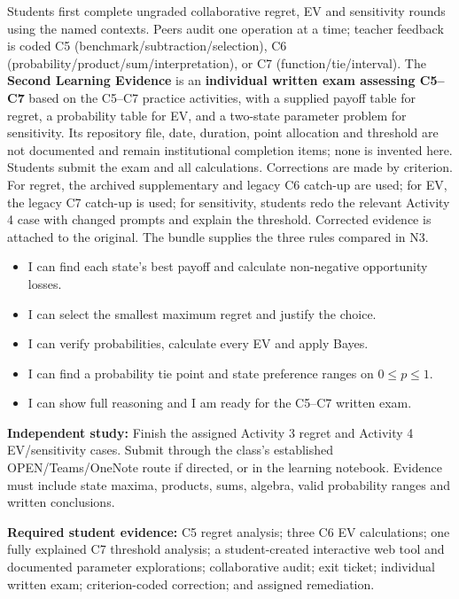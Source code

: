 \documentclass[10pt,letterpaper]{article}
\newcommand{\labelled}[2]{\textbf{#1:} #2\par}
\newcommand{\partheading}[1]{\Needspace{6\baselineskip}\par\vspace{5pt}{\bfseries #1\par}\vspace{1pt}}
\newcommand{\evidenceitem}[1]{\item[$\square$] #1}
\begin{document}
\begin{bluebox}
		\partheading{Practice and Assessment---Second Learning Evidence}
		Students first complete ungraded collaborative regret, EV and sensitivity
		rounds using the named contexts. Peers audit one operation at a time; teacher
		feedback is coded C5 (benchmark/subtraction/selection), C6
		(probability/product/sum/interpretation), or C7 (function/tie/interval).
		The \textbf{Second Learning Evidence} is an \textbf{individual written exam
		assessing C5--C7} based on the C5--C7 practice activities, with a supplied payoff table for regret, a probability
		table for EV, and a two-state parameter problem for sensitivity. Its repository
		file, date, duration, point allocation and threshold are not documented and
		remain institutional completion items; none is invented here. Students submit
		the exam and all calculations. Corrections are made by criterion. For regret,
		the archived supplementary and legacy C6 catch-up are used; for EV, the legacy
		C7 catch-up is used; for sensitivity, students redo the relevant Activity 4
		case with changed prompts and explain the threshold. Corrected evidence is
		attached to the original. The bundle supplies the three rules compared in N3.
		
		\partheading{Exit Ticket N2}
		\begin{itemize}[leftmargin=1.8em,itemsep=1pt]
			\evidenceitem{I can find each state's best payoff and calculate non-negative opportunity losses.}
			\evidenceitem{I can select the smallest maximum regret and justify the choice.}
			\evidenceitem{I can verify probabilities, calculate every EV and apply Bayes.}
			\evidenceitem{I can find a probability tie point and state preference ranges on $0\leq p\leq1$.}
			\evidenceitem{I can show full reasoning and I am ready for the C5--C7 written exam.}
		\end{itemize}
		
		\labelled{Independent study}{Finish the assigned Activity 3 regret and Activity 4 EV/sensitivity cases. Submit through the class's established OPEN/Teams/OneNote route if directed, or in the learning notebook. Evidence must include state maxima, products, sums, algebra, valid probability ranges and written conclusions.}
		\labelled{Required student evidence}{C5 regret analysis; three C6 EV calculations; one fully explained C7 threshold analysis; a student-created interactive web tool and documented parameter explorations; collaborative audit; exit ticket; individual written exam; criterion-coded correction; and assigned remediation.}
	\end{bluebox}
	
\end{document}
